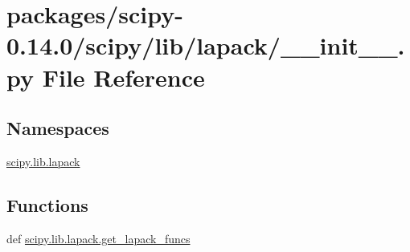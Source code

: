\hypertarget{packages_2scipy-0_814_80_2scipy_2lib_2lapack_2____init_____8py}{}\section{packages/scipy-\/0.14.0/scipy/lib/lapack/\+\_\+\+\_\+init\+\_\+\+\_\+.py File Reference}
\label{packages_2scipy-0_814_80_2scipy_2lib_2lapack_2____init_____8py}
\subsection*{Namespaces}
\begin{DoxyCompactItemize}
\item 
 \hyperlink{namespacescipy_1_1lib_1_1lapack}{scipy.\+lib.\+lapack}
\end{DoxyCompactItemize}
\subsection*{Functions}
\begin{DoxyCompactItemize}
\item 
def \hyperlink{namespacescipy_1_1lib_1_1lapack_a3978edf478323eb87be48df7f590ebcf}{scipy.\+lib.\+lapack.\+get\+\_\+lapack\+\_\+funcs}
\end{DoxyCompactItemize}
